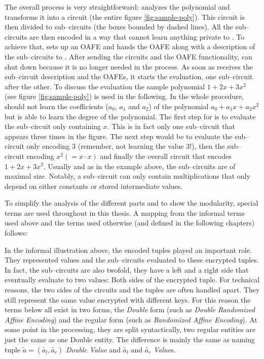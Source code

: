 The overall process is very straightforward: \JWpOne{} analyzes the polynomial
and transforms it into a circuit (the entire figure \ref{fig:sample-poly}). This
circuit is then divided to sub--circuits (the boxes bounded by dashed lines).
All the sub--circuits are then encoded in a way that \JWpTwo{} cannot learn
anything private to \JWpOne{}. To achieve that, \JWpOne{} sets up an OAFE and
hands the OAFE along with a description of the sub--circuits to \JWpTwo{}.
After sending the circuits and the OAFE functionality, \JWpOne{} can shut down
because it is no longer needed in the process. As soon as \JWpTwo{} receives the
sub--circuit description and the OAFEs, it starts the evaluation, one
sub--circuit after the other. To discuss the evaluation the sample polynomial $1
+ 2x + 3x^2$ (see figure \ref{fig:sample-poly}) is used in the following. In the
whole procedure, \JWpTwo{} should not learn the coefficients ($a_0$, $a_1$ and
$a_2$) of the polynomial $a_0 + a_1x + a_2x^2$ but is able to learn the degree
of the polynomial. The first step for \JWpTwo{} is to evaluate the sub--circuit
only containing $x$.  This is in fact only one sub--circuit that appears three
times in the figure.  The next step would be to evaluate the sub--circuit only
encoding $3$ (remember, not learning the value $3$!), then the sub--circuit
encoding $x^2 (= x \cdot x)$ and finally the overall circuit that encodes $1 +
2x + 3x^2$.  Usually and as in the example above, the sub--circuits are of
maximal size. Notably, a sub--circuit can only contain multiplications that only
depend on either constants or stored intermediate values.

To simplify the analysis of the different parts and to show the
modularity, special terms are used throughout in this thesis. A mapping from the
informal terms used above and the terms used otherwise (and defined in the
following chapters) follows:

In the informal illustration above, the encoded tuples played an important role.
They represented values and the sub--circuits evaluated to these encrypted
tuples. In fact, the sub--circuits are also twofold, they have a left and a
right side that eventually evaluate to two values: Both sides of the encrypted
tuple. For technical reasons, the two sides of the circuits and the tuples are
often handled apart. They still represent the same value encrypted with
different keys. For this reason the terms below all exist in two forms, the
\emph{Double} form (such as \emph{Double Randomized Affine Encoding}) and the
regular form (such as \emph{Randomized Affine Encoding}). At some point in the
processing, they are split syntactically, two regular entities are just the same
as one Double entity. The difference is mainly the same as naming tuple
$\widetilde{a} = (\widetilde{a_l}, \widetilde{a_r})$ \emph{Double Value} and
$\widetilde{a_l}$ and $\widetilde{a_r}$ \emph{Value}s.

